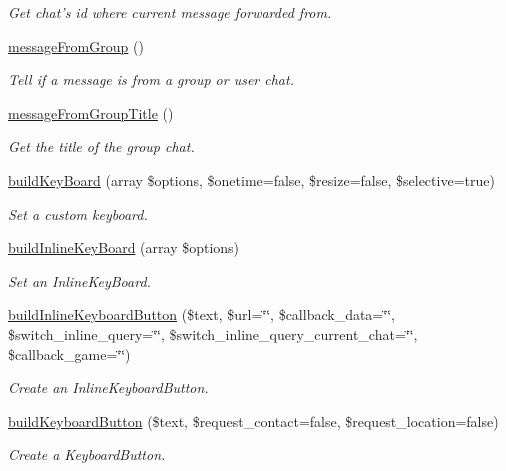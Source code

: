 \begin{DoxyCompactItemize}
\begin{DoxyCompactList}\small\item\em \-Get chat's id where current message forwarded from. \end{DoxyCompactList}\item 
\hyperlink{class_telegram_a59b7bf91ea3b26d732f7536c2d65da19}{message\-From\-Group} ()
\begin{DoxyCompactList}\small\item\em \-Tell if a message is from a group or user chat. \end{DoxyCompactList}\item 
\hyperlink{class_telegram_acd2c4c8c6f15dbb1f25af2f539c2ec16}{message\-From\-Group\-Title} ()
\begin{DoxyCompactList}\small\item\em \-Get the title of the group chat. \end{DoxyCompactList}\item 
\hyperlink{class_telegram_a5c9619923ae1810aa340fa0e9acc1744}{build\-Key\-Board} (array \$options, \$onetime=false, \$resize=false, \$selective=true)
\begin{DoxyCompactList}\small\item\em \-Set a custom keyboard. \end{DoxyCompactList}\item 
\hyperlink{class_telegram_a81212e5e1fe0b3f72dd503a71577bbc4}{build\-Inline\-Key\-Board} (array \$options)
\begin{DoxyCompactList}\small\item\em \-Set an \-Inline\-Key\-Board. \end{DoxyCompactList}\item 
\hyperlink{class_telegram_a01432df36d1939f6c8dc09501f4ffcd3}{build\-Inline\-Keyboard\-Button} (\$text, \$url=\char`\"{}\char`\"{}, \$callback\-\_\-data=\char`\"{}\char`\"{}, \$switch\-\_\-inline\-\_\-query=\char`\"{}\char`\"{}, \$switch\-\_\-inline\-\_\-query\-\_\-current\-\_\-chat=\char`\"{}\char`\"{}, \$callback\-\_\-game=\char`\"{}\char`\"{})
\begin{DoxyCompactList}\small\item\em \-Create an \-Inline\-Keyboard\-Button. \end{DoxyCompactList}\item 
\hyperlink{class_telegram_a611a52a2e9be838207b3943007a76b6c}{build\-Keyboard\-Button} (\$text, \$request\-\_\-contact=false, \$request\-\_\-location=false)
\begin{DoxyCompactList}\small\item\em \-Create a \-Keyboard\-Button. \end{DoxyCompactList}\item 

\end{DoxyCompactItemize}
